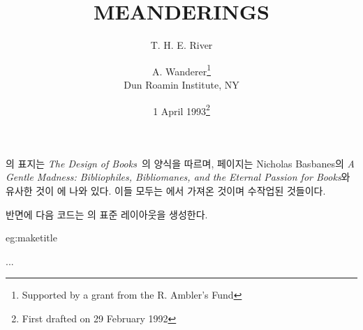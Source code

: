 의 표지는 \textit{The Design of
Books}~\cite{ADRIANWILSON93}의 양식을 따르며, 페이지는 Nicholas Basbanes의
\textit{A Gentle Madness: Bibliophiles, Bibliomanes, and the Eternal Passion
for Books}와 유사한 것이 에 나와 있다.
이들 모두는 \cite{TITLEPAGES}에서 가져온 것이며 수작업된 것들이다.

반면에 다음 코드는 \cmd{\maketitle}의 표준 레이아웃을 생성한다.

\begin{egsource}{eg:maketitle}
\title{MEANDERINGS}
\author{T. H. E. River \and
        A. Wanderer\thanks{Supported by a grant from the 
        R. Ambler's Fund}\\
        Dun Roamin Institute, NY}
\date{1 April 1993\thanks{First drafted on 29 February 1992}}
...
\maketitle
\end{egsource}

